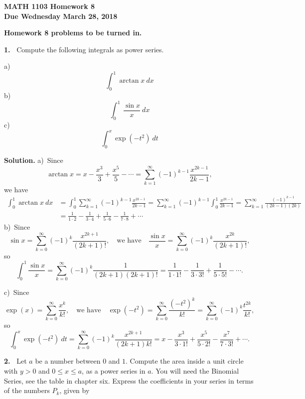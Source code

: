 \documentclass[12pt]{article}
\theoremstyle{definition}
\theoremstyle{remark}
\theoremstyle{definition}
\newenvironment{Solution}{\noindent\textbf{Solution.}}{}
\begin{document}
  

{\bf MATH 1103 Homework 8}\\
{\bf Due Wednesday March 28, 2018}






{\bf Homework 8 problems to be turned in.}

{\bf 1.\ } Compute the following integrals as power series.

a)\ \[\int_0^1 \arctan x\ dx\]
b)\ \[\int_0^1\ \frac{\sin x}{x}\ dx\]
c)\ \[\int_0^x \exp(-t^2)\ dt\]

\begin{Solution}
a)\ Since 
\[\arctan x=x-\frac{x^3}{3}+\frac{x^5}{5}-\cdots=
\sum_{k=1}^\infty(-1)^{k-1}\frac{x^{2k-1}}{2k-1},
\]
we have
\[\begin{split}
\int_0^1 \arctan x\ dx
&=\int_0^1\sum_{k=1}^\infty(-1)^{k-1}\frac{x^{2k-1}}{2k-1}
=\sum_{k=1}^\infty(-1)^{k-1}\int_0^1\frac{x^{2k-1}}{2k-1}
=\sum_{k=1}^\infty\frac{(-1)^{k-1}}{(2k-1)(2k)}\\
&=\frac{1}{1\cdot 2}-\frac{1}{3\cdot 4}+\frac{1}{5\cdot 6}-\frac{1}{7\cdot 8}+\cdots
\end{split}
\]
b)\ Since 
\[\sin x=\sum_{k=0}^\infty(-1)^{k}\frac{x^{2k+1}}{(2k+1)!},
\quad\text{we have}\quad
\frac{\sin x}{x}=\sum_{k=0}^\infty(-1)^{k}\frac{x^{2k}}{(2k+1)!},
\]
so 
\[\int_0^1\frac{\sin x}{x}=\sum_{k=0}^\infty(-1)^{k}\frac{1}{(2k+1)(2k+1)!}
=\frac{1}{1\cdot 1!}-\frac{1}{3\cdot 3!}+\frac{1}{5\cdot 5!}-\cdots.
\]

c)\ Since 
\[\exp(x)=\sum_{k=0}^\infty \frac{x^k}{k!},\quad\text{we have}\quad
\exp(-t^2)=\sum_{k=0}^\infty \frac{(-t^2)^k}{k!}=\sum_{k=0}^\infty (-1)^k\frac{t^{2k}}{k!},\]
so
\[\int_0^x\exp(-t^2)\ dt=\sum_{k=0}^\infty (-1)^k\frac{x^{2k+1}}{(2k+1)k!}
=x-\frac{x^{3}}{3\cdot 1!}+\frac{x^{5}}{5\cdot 2!}-\frac{x^{7}}{7\cdot 3!}+\cdots.
\]
\end{Solution}

{\bf 2.\ } Let $a$ be a number between $0$ and $1$. 
Compute the area inside a unit circle with $y>0$ and $0\leq x\leq a$, as a power series in $a$. You will need the Binomial Series, see the table in chapter six. Express the coefficients in your series in terms of the numbers $P_k$, given by 
\end{document}

